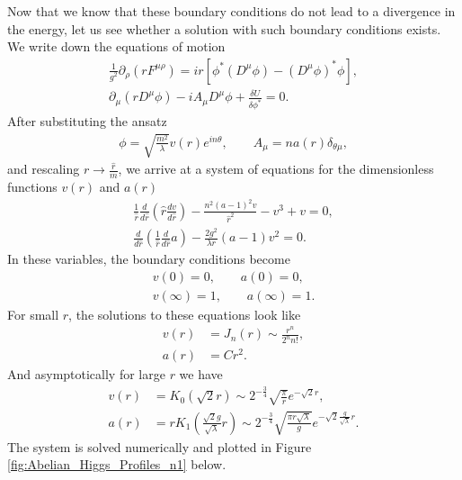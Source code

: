     Now that we know that these boundary conditions do not lead to a divergence in the energy, let us see whether a solution with such boundary conditions exists. We write down the equations of motion
    \begin{align}
        \frac{1}{g^2}  \partial_{\rho}(r F^{\mu \rho}) = i r \left[\phi^* \left(D^{\mu}\phi\right) - \left(D^{\mu}\phi \right)^* \phi \right], \nonumber \\
        \partial_{\mu} \left(r D^{\mu} \phi \right) - i A_{\mu} D^{\mu} \phi + \frac{\delta U}{\delta \phi^*} =0.
    \end{align}
    After substituting the ansatz
    \begin{align}
        \phi = \sqrt{\frac{m^2}{\lambda}}v(r) e^{i n \theta}, \qquad A_{\mu} = n a(r) \delta_{\theta \mu},
    \end{align}
    and rescaling $r\rightarrow \frac{\hat{r}}{m}$, we arrive at a system of equations for the dimensionless functions $v(r)$ and $a(r)$
    \begin{align}
        \frac{1}{\hat{r}} \frac{d }{d \hat{r}} \left(\hat{r} \frac{d v}{d \hat{r}} \right) - \frac{n^2 (a-1)^2 v}{\hat{r}^2} -v^3 +v =0,  \\
        \frac{d}{d \hat{r}}\left(\frac{1}{\hat{r}}\frac{d}{d \hat{r}} a \right)- \frac{2 g^2}{\lambda r} (a-1)v^2=0.
    \end{align}
    In these variables, the boundary conditions become
    \begin{align}
        v(0) = 0, \qquad a(0)=0, \\
        v(\infty) =1, \qquad a(\infty) =1.
    \end{align}
    For small $r$, the solutions to these equations look like
    \begin{align}
        v(r)&= J_n(r) \sim \frac{r^n}{ 2^n n!}, \\
        a(r)&= C r^2.
    \end{align}
    And asymptotically for large $r$ we have
    \begin{align}
        v(r)&=K_0\left(\sqrt{2} r\right)\sim 2^{-\frac{3}{4}}\sqrt{\frac{\pi}{r}} e^{- \sqrt{2} r} , \label{eq:Asymptotics1_Abelian_Higgs} \\
        a(r)&=r K_1\left(\frac{\sqrt{2} g}{\sqrt{\lambda}} r \right)\sim 2^{- \frac{3}{4}} \sqrt{\frac{\pi r \sqrt{\lambda}}{g}} e^{- \sqrt{2} \frac{g}{\sqrt{\lambda}}r}. \label{eq:Asymptotics2_Abelian_Higgs}
    \end{align}
    The system is solved numerically and plotted in Figure \ref{fig:Abelian_Higgs_Profiles_n1} below.
